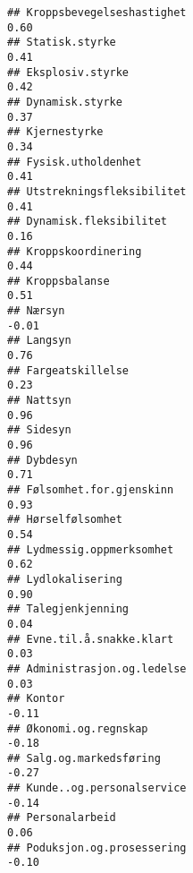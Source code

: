 \documentclass[
]{article}
\begin{document}
\begin{verbatim}
## Kroppsbevegelseshastighet                                                         0.60
## Statisk.styrke                                                                    0.41
## Eksplosiv.styrke                                                                  0.42
## Dynamisk.styrke                                                                   0.37
## Kjernestyrke                                                                      0.34
## Fysisk.utholdenhet                                                                0.41
## Utstrekningsfleksibilitet                                                         0.41
## Dynamisk.fleksibilitet                                                            0.16
## Kroppskoordinering                                                                0.44
## Kroppsbalanse                                                                     0.51
## Nærsyn                                                                           -0.01
## Langsyn                                                                           0.76
## Fargeatskillelse                                                                  0.23
## Nattsyn                                                                           0.96
## Sidesyn                                                                           0.96
## Dybdesyn                                                                          0.71
## Følsomhet.for.gjenskinn                                                           0.93
## Hørselfølsomhet                                                                   0.54
## Lydmessig.oppmerksomhet                                                           0.62
## Lydlokalisering                                                                   0.90
## Talegjenkjenning                                                                  0.04
## Evne.til.å.snakke.klart                                                           0.03
## Administrasjon.og.ledelse                                                         0.03
## Kontor                                                                           -0.11
## Økonomi.og.regnskap                                                              -0.18
## Salg.og.markedsføring                                                            -0.27
## Kunde..og.personalservice                                                        -0.14
## Personalarbeid                                                                    0.06
## Poduksjon.og.prosessering                                                        -0.10

\end{verbatim}
\end{document}
